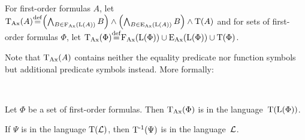 \begin{defi}
	For first-order formulas $A$, let $\TransAll(A) \defeq
	\left(\bigwedge_{B\in\FAX(\Lang(A))} B \right) \land
	\left(\bigwedge_{B\in\EAX(\Lang(A))} B \right) \land
	\Trans(A)$ and for sets of first-order formulas $\Phi$, let $\TransAll(\Phi) \defeq \FAX(\Lang(\Phi)) \cup  \EAX(\Lang(\Phi)) \cup \Trans(\Phi)$.
\end{defi}


Note that $\operatorname{\operatorname{T}_{Ax}}(A)$ contains neither the equality predicate nor function symbols but additional predicate symbols instead. More formally:



\begin{lemma}~ 
	\label{lemma:transLang}
	\begin{compactenum}
	\item
		Let $\Phi$ be a set of first-order formulas. Then $\operatorname{\operatorname{T}_{Ax}}(\Phi)$ is in the language~$\operatorname{T}(\operatorname{L}(\Phi))$.
		\label{lemma:transLang1}

	\item 
		If $\Psi$ is in the language $\operatorname{T}(\operatorname{\mathcal{L}})$, then $\operatorname{T^{-1}}(\Psi)$ is in the language~$\operatorname{\mathcal{L}}$.
		\label{lemma:transLang2}
	\end{compactenum}
\end{lemma}


